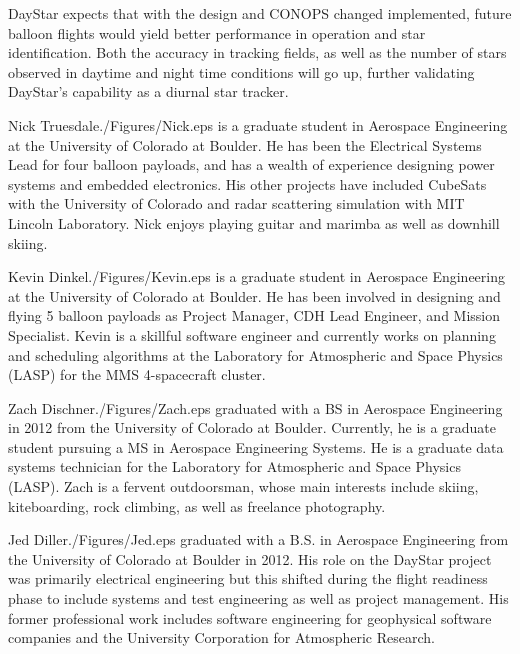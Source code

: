 \documentclass[twocolumn,letterpaper]{IEEEAerospace2012}
\newcommand{\rootdir}{./Figures/}
\begin{document}
DayStar expects that with the design and CONOPS changed implemented, future balloon flights would yield better performance in operation and star identification. Both the accuracy in tracking fields, as well as the number of stars observed in daytime and night time conditions will go up, further validating DayStar's capability as a diurnal star tracker.




\thebiography
\begin{biographywithpic}{Nick Truesdale}{\rootdir Nick.eps}
is a graduate student in Aerospace Engineering at the University of Colorado at Boulder.
He has been the Electrical Systems Lead for four balloon payloads, and has a wealth of experience designing power systems and embedded electronics. His other projects have included CubeSats with the University of Colorado and radar scattering simulation with MIT Lincoln Laboratory. Nick enjoys playing guitar and marimba as well as downhill skiing.
\end{biographywithpic}

\begin{biographywithpic} {Kevin Dinkel}{\rootdir Kevin.eps}
is a graduate student in Aerospace Engineering at the University of Colorado at Boulder. He has been involved in designing and flying 5 balloon payloads as Project Manager, CDH Lead Engineer, and Mission Specialist. Kevin is a skillful software engineer and currently works on planning and scheduling algorithms at the Laboratory for Atmospheric and Space Physics (LASP) for the MMS 4-spacecraft cluster.
\end{biographywithpic}

\begin{biographywithpic}{Zach Dischner}{\rootdir Zach.eps}
graduated with a BS in Aerospace Engineering in 2012 from the University of Colorado at Boulder. Currently, he is a graduate student pursuing a MS in Aerospace Engineering Systems. He is a graduate data systems technician for the Laboratory for Atmospheric and Space Physics (LASP). Zach is a fervent outdoorsman, whose main interests include skiing, kiteboarding, rock climbing, as well as freelance photography.
\end{biographywithpic}

\begin{biographywithpic}{Jed Diller}{\rootdir Jed.eps}
graduated with a B.S. in Aerospace Engineering from the University of Colorado at Boulder in 2012. His role on the DayStar project was primarily electrical engineering but this shifted during the flight readiness phase to include systems and test engineering as well as project management. His former professional work includes software engineering for geophysical software companies and the University Corporation for Atmospheric Research.
\end{biographywithpic}
\end{document}
